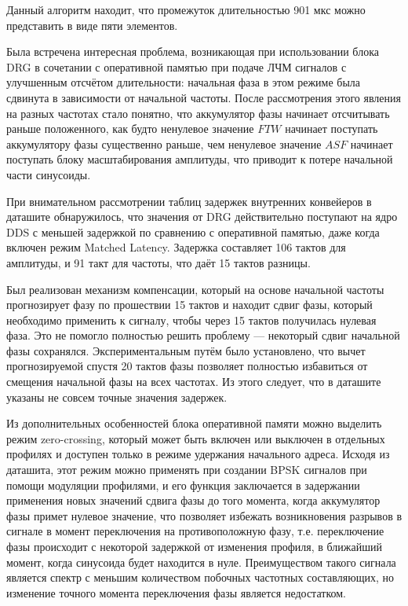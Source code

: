 \documentclass[rusmathsym, eqnumwithinsec, amspack, hyperref]{bomgost}
\begin{document}
Данный алгоритм находит, что промежуток длительностью 901 мкс можно представить в виде пяти элементов.

Была встречена интересная проблема, возникающая при использовании блока DRG в сочетании с оперативной памятью при подаче ЛЧМ сигналов с улучшенным отсчётом длительности: начальная фаза в этом режиме была сдвинута в зависимости от начальной частоты. После рассмотрения этого явления на разных частотах стало понятно, что аккумулятор фазы начинает отсчитывать раньше положенного, как будто ненулевое значение $FTW$ начинает поступать аккумулятору фазы существенно раньше, чем ненулевое значение $ASF$ начинает поступать блоку масштабирования амплитуды, что приводит к потере начальной части синусоиды.

При внимательном рассмотрении таблиц задержек внутренних конвейеров в даташите обнаружилось, что значения от DRG действительно поступают на ядро DDS с меньшей задержкой по сравнению с оперативной памятью, даже когда включен режим Matched Latency. Задержка составляет 106 тактов для амплитуды, и 91 такт для частоты, что даёт 15 тактов разницы.

Был реализован механизм компенсации, который на основе начальной частоты прогнозирует фазу по прошествии 15 тактов и находит сдвиг фазы, который необходимо применить к сигналу, чтобы через 15 тактов получилась нулевая фаза. Это не помогло полностью решить проблему --- некоторый сдвиг начальной фазы сохранялся. Экспериментальным путём было установлено, что вычет прогнозируемой спустя 20 тактов фазы позволяет полностью избавиться от смещения начальной фазы на всех частотах. Из этого следует, что в даташите указаны не совсем точные значения задержек.

Из дополнительных особенностей блока оперативной памяти можно выделить режим zero-crossing, который может быть включен или выключен в отдельных профилях и доступен только в режиме удержания начального адреса. Исходя из даташита, этот режим можно применять при создании BPSK сигналов при помощи модуляции профилями, и его функция заключается в задержании применения новых значений сдвига фазы до того момента, когда аккумулятор фазы примет нулевое значение, что позволяет избежать возникновения разрывов в сигнале в момент переключения на противоположную фазу, т.е. переключение фазы происходит с некоторой задержкой от изменения профиля, в ближайший момент, когда синусоида будет находится в нуле. Преимуществом такого сигнала является спектр с меньшим количеством побочных частотных составляющих, но изменение точного момента переключения фазы является недостатком.
\end{document}
